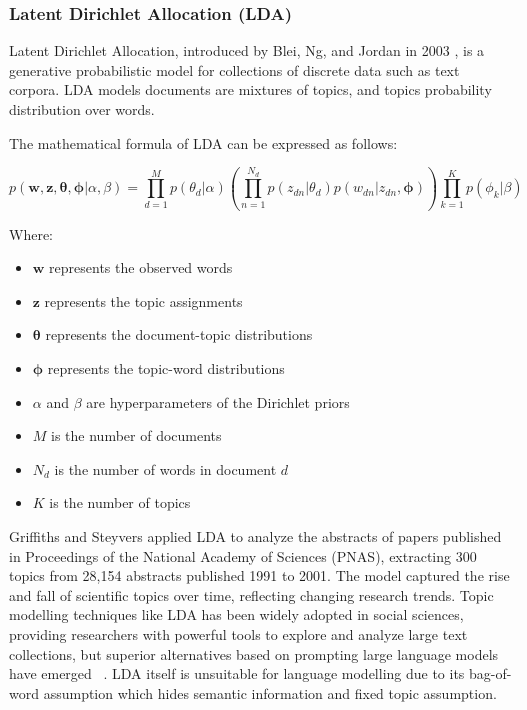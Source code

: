 \documentclass[a4paper, oneside]{discothesis}
\begin{document}
\subsubsection{Latent Dirichlet Allocation (LDA)}
Latent Dirichlet Allocation, introduced by Blei, Ng, and Jordan in 2003 \cite{blei2003latent}, is a generative probabilistic model for collections of discrete data such as text corpora. 
LDA models documents are mixtures of topics, and topics probability distribution over words.

The mathematical formula of LDA can be expressed as follows:

\begin{equation}
p(\mathbf{w}, \mathbf{z}, \boldsymbol{\theta}, \boldsymbol{\phi} | \alpha, \beta) = 
\prod_{d=1}^M p(\theta_d | \alpha) 
\left( \prod_{n=1}^{N_d} p(z_{dn} | \theta_d) p(w_{dn} | z_{dn}, \boldsymbol{\phi}) \right)
\prod_{k=1}^K p(\phi_k | \beta)
\end{equation}

Where:
\begin{itemize}
    \item $\mathbf{w}$ represents the observed words
    \item $\mathbf{z}$ represents the topic assignments
    \item $\boldsymbol{\theta}$ represents the document-topic distributions
    \item $\boldsymbol{\phi}$ represents the topic-word distributions
    \item $\alpha$ and $\beta$ are hyperparameters of the Dirichlet priors
    \item $M$ is the number of documents
    \item $N_d$ is the number of words in document $d$
    \item $K$ is the number of topics
\end{itemize}

Griffiths and Steyvers \cite{griffiths2004finding} applied LDA to analyze the abstracts of papers published in Proceedings of the National Academy of Sciences (PNAS), 
extracting 300 topics from 28,154 abstracts published 1991 to 2001. The model captured the rise and fall of scientific topics over time, reflecting changing research trends.
Topic modelling techniques like LDA has been widely adopted in social sciences, providing researchers with powerful tools to explore and analyze large text collections, 
but superior alternatives based on prompting large language models have emerged ~\cite{wang2023promptinglargelanguagemodels}. LDA itself is unsuitable for language modelling due to its bag-of-word assumption which hides semantic information and fixed topic assumption.  
\end{document}
